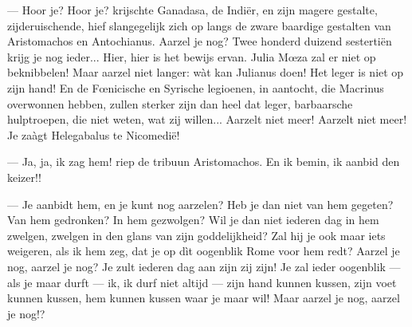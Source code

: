 \documentclass[a4paper, 12pt, oneside, dutch]{article}
\begin{document}
--- Hoor je? Hoor je? krijschte Ganadasa, de Indiër, en zijn magere gestalte, zijderuischende, hief slangegelijk zich op langs de zware baardige gestalten van Aristomachos en Antochianus. Aarzel je nog? Twee honderd duizend sestertiën krijg je nog ieder... Hier, hier is het bewijs ervan. Julia Mœza zal er niet op beknibbelen! Maar aarzel niet langer: wàt kan Julianus doen! Het leger is niet op zijn hand! En de Fœnicische en Syrische legioenen, in aantocht, die Macrinus overwonnen hebben, zullen sterker zijn dan heel dat leger, barbaarsche hulptroepen, die niet weten, wat zij willen... Aarzelt niet meer! Aarzelt niet meer! Je zaàgt Helegabalus te Nicomedië!

--- Ja, ja, ik zag hem! riep de tribuun Aristomachos. En ik bemin, ik aanbid den keizer!!

--- Je aanbidt hem, en je kunt nog aarzelen? Heb je dan niet van hem gegeten? Van hem gedronken? In hem gezwolgen? Wil je dan niet iederen dag in hem zwelgen, zwelgen in den glans van zijn goddelijkheid? Zal hij je ook maar iets weigeren, als ik hem zeg, dat je op dìt oogenblik Rome voor hem redt? Aarzel je nog, aarzel je nog? Je zult iederen dag aan zijn zij zijn! Je zal ieder oogenblik --- als je maar durft --- ik, ik durf niet altijd --- zijn hand kunnen kussen, zijn voet kunnen kussen, hem kunnen kussen waar je maar wil! Maar aarzel je nog, aarzel je nog!?
\end{document}
